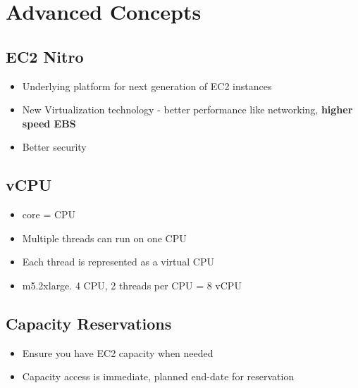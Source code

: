 \documentclass[]{scrartcl}
\begin{document}
\section{Advanced Concepts}

\subsection{EC2 Nitro}
\begin{itemize}
	\item Underlying platform for next generation of EC2 instances
	\item New Virtualization technology - better performance like networking, \textbf{higher speed EBS}
	\item Better security
\end{itemize}

\subsection{vCPU}
\begin{itemize}
	\item core = CPU
	\item Multiple threads can run on one CPU
	\item Each thread is represented as a virtual CPU
	\item m5.2xlarge. 4 CPU, 2 threads per CPU = 8 vCPU
\end{itemize}

\subsection{Capacity Reservations}
\begin{itemize}
	\item Ensure you have EC2 capacity when needed
	\item Capacity access is immediate, planned end-date for reservation
\end{itemize}
\end{document}
